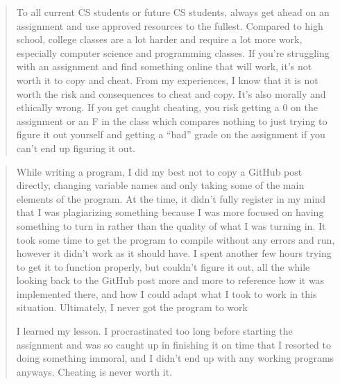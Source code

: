 \documentclass[12pt]{scrartcl}
\begin{document}
\begin{quote}
To all current CS students or future CS students, always get ahead on 
an assignment and use approved resources to the fullest.  Compared to 
high school, college classes are a lot harder and require a lot more 
work, especially computer science and programming classes.  If you're 
struggling with an assignment and find something online that will work, 
it's not worth it to copy and cheat.  From my experiences, I know that 
it is not worth the risk and consequences to cheat and copy.  It's also 
morally and ethically wrong.  If you get caught cheating, you risk 
getting a 0 on the assignment or an F in the class which compares 
nothing to just trying to figure it out yourself and getting a ``bad'' 
grade on the assignment if you can't end up figuring it out. 
\end{quote}

\begin{quote}
While writing a program, I did my best not to copy a GitHub post directly, 
changing variable names and only taking some of the main elements of the 
program. At the time, it didn't fully register in my mind that I was 
plagiarizing something because I was more focused on having something 
to turn in rather than the quality of what I was turning in. It took 
some time to get the program to compile without any errors and run, 
however it didn't work as it should have. I spent another few hours 
trying to get it to function properly, but couldn't figure it out, 
all the while looking back to the GitHub post more and more to reference 
how it was implemented there, and how I could adapt what I took to work 
in this situation. Ultimately, I never got the program to work

I learned my lesson. I procrastinated too long before starting the assignment and was so caught up in finishing it on time that I resorted to doing something immoral, and I didn't end up with any working programs anyways. Cheating is never worth it.
\end{quote}
\end{document}
